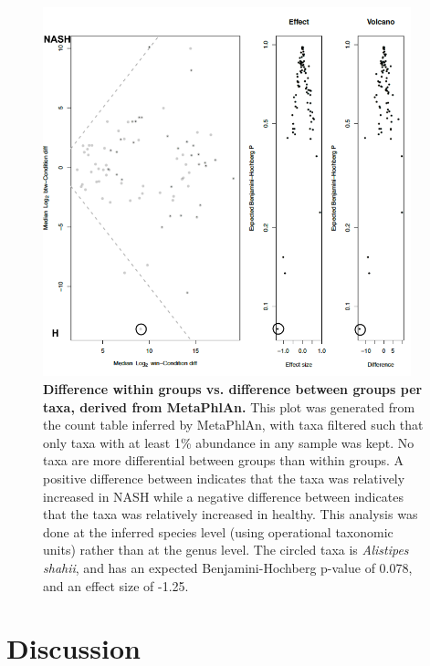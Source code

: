 \begin{figure}[h]
\begin{center}
\includegraphics[width=0.95\textwidth]{metaphlan_aldex.png}
\caption[Difference within groups vs. difference between groups per taxa, derived from MetaPhlAn.]{\textbf{Difference within groups vs. difference between groups per taxa, derived from MetaPhlAn.} This plot was generated from the count table inferred by MetaPhlAn, with taxa filtered such that only taxa with at least 1\% abundance in any sample was kept. No taxa are more differential between groups than within groups. A positive difference between indicates that the taxa was relatively increased in NASH while a negative difference between indicates that the taxa was relatively increased in healthy. This analysis was done at the inferred species level (using operational taxonomic units) rather than at the genus level. The circled taxa is \textit{Alistipes shahii}, and has an expected Benjamini-Hochberg p-value of 0.078, and an effect size of -1.25.}
\label{nafld_metaphlan_aldex}
\end{center}
\end{figure}



\FloatBarrier

\section{Discussion}

